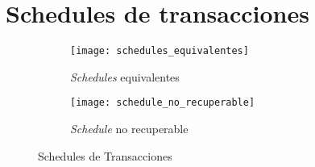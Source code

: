 \documentclass[a4paper, twoside]{article}
\begin{document}
\section{Schedules de transacciones}
\begin{figure}[H]
	\centering
	\begin{subfigure}{0.66\textwidth}
		\centering
		\texttt{[image: schedules\_equivalentes]}
		\caption{\emph{Schedules} equivalentes}
	\end{subfigure}
	\begin{subfigure}{0.32\textwidth}
		\centering
		\texttt{[image: schedule\_no\_recuperable]}
		\caption{\emph{Schedule} no recuperable}
	\end{subfigure}
	\caption{Schedules de Transacciones}
\end{figure}
\end{document}
